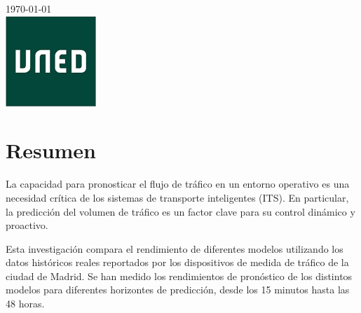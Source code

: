 \begin{titlepage}


{\large \today}\\[2cm] %


\includegraphics{images/university}\\[1cm] %


\vfill %

\end{titlepage}



\chapter*{Resumen}

La capacidad para pronosticar el flujo de tráfico en un entorno operativo es una necesidad crítica de los sistemas de transporte inteligentes (ITS). En particular, la predicción del volumen de tráfico es un factor clave para su control dinámico y proactivo.

Esta investigación compara el rendimiento de diferentes modelos utilizando los datos históricos reales reportados por los dispositivos de medida de tráfico de la ciudad de Madrid. Se han medido los rendimientos de pronóstico de los distintos modelos para diferentes horizontes de predicción, desde los 15 minutos hasta las 48 horas.

